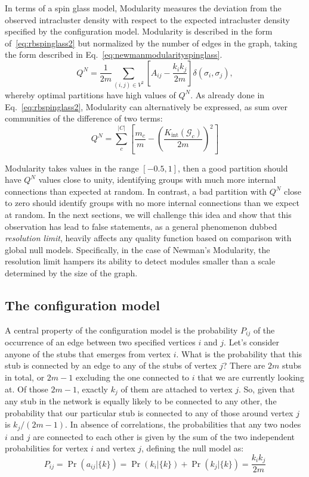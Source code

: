 In terms of a spin glass model, Modularity measures the deviation from the observed intracluster density with respect to the expected intracluster density specified by the configuration model. Modularity is described in the form of~\ref{eq:rbspinglass2} but normalized by the number of edges in the graph, taking the form described in Eq.~\ref{eq:newmanmodularityspinglass}.
\begin{equation}\label{eq:newmanmodularityspinglass}
Q^N =  \frac{1}{2m} \sum_{ (i,j) \in V^2} \left[ A_{ij} - \frac{k_i k_j}{2m} \right] \delta(\sigma_i,\sigma_j),
\end{equation}
whereby optimal partitions have high values of $Q^N$. As already done in Eq.~\ref{eq:rbspinglass2}, Modularity can alternatively be expressed, as sum over communities of the difference of two terms:
\begin{equation}\label{eq:newmanmodularity}
Q^N = \sum_{c}^{|C|} \left[ \frac{m_c}{m} - \left( \frac{K_{\textrm{int}}(\mathcal{G}_c)}{2m} \right)^2 \right]
\end{equation}

Modularity takes values in the range $[-0.5,1]$, then a good partition should have $Q^N$ values close to unity, identifying groups with much more internal connections than expected at random. In contrast, a bad partition with $Q^N$ close to zero should identify groups with no more internal connections than we expect at random.
In the next sections, we will challenge this idea and show that this observation has lead to false statements, as a general phenomenon dubbed \emph{resolution limit}, heavily affects any quality function based on comparison with global null models. Specifically, in the case of Newman's Modularity, the resolution limit hampers its ability to detect modules smaller than a scale determined by the size of the graph.

\subsection{The configuration model}\label{sec:configuration_model}
A central property of the configuration model is the probability $P_{ij}$ of the occurrence of an edge between two specified vertices $i$ and $j$.
Let's consider anyone of the stubs that emerges from vertex $i$.
What is the probability that this stub is connected by an edge to any of the stubs of vertex $j$?
There are $2m$ stubs in total, or $2m - 1$ excluding the one connected to $i$ that we are currently looking at.
Of those $2m - 1$, exactly $k_j$ of them are attached to vertex $j$.
So, given that any stub in the network is equally likely to be connected to any other, the probability that our particular stub is connected to any of those around vertex $j$ is $k_j/(2m-1)$.
In absence of correlations, the probabilities that any two nodes $i$ and $j$ are connected to each other is given by the sum of the two independent probabilities for vertex $i$ and vertex $j$, defining the null model as:
\begin{equation}\label{eq:configuration_model_probability}
P_{ij} = \Pr \left ( a_{ij} | \{ k \} \right) = \Pr(k_i | \{ k \}) + \Pr(k_j | \{ k \})=\frac{k_i k_j}{2m}
\end{equation}

